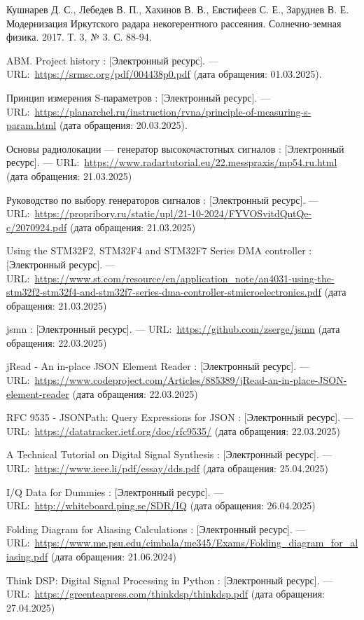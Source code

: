 \documentclass{report}
\begin{document}
\begin{thebibliography}{}

 Кушнарев Д. С., Лебедев В. П., Хахинов В. В., Евстифеев С. Е., Заруднев В. Е. Модернизация Иркутского радара некогерентного рассеяния. Солнечно-земная физика. 2017. Т. 3, № 3. С. 88-94.

 ABM. Project history : [Электронный ресурс]. --– URL:~\url{https://srmsc.org/pdf/004438p0.pdf} (дата обращения: 01.03.2025).

 Принцип измерения S-параметров : [Электронный ресурс]. --– URL:~\url{https://planarchel.ru/instruction/rvna/principle-of-measuring-s-param.html} (дата обращения: 20.03.2025).

 Основы радиолокации --- генератор высокочастотных сигналов : [Электронный ресурс]. --– URL:~\url{https://www.radartutorial.eu/22.messpraxis/mp54.ru.html} (дата обращения: 21.03.2025)

 Руководство по выбору генераторов сигналов : [Электронный ресурс]. --– URL:~\url{https://propribory.ru/static/upl/21-10-2024/FYVOSvitdQntQe-c/2070924.pdf} (дата обращения: 21.03.2025)

 Using the STM32F2, STM32F4 and STM32F7 Series DMA controller : [Электронный ресурс]. --– URL:~\url{https://www.st.com/resource/en/application_note/an4031-using-the-stm32f2-stm32f4-and-stm32f7-series-dma-controller-stmicroelectronics.pdf} (дата обращения: 21.03.2025)

 jsmn : [Электронный ресурс]. --– URL:~\url{https://github.com/zserge/jsmn} (дата обращения: 22.03.2025)

 jRead - An in-place JSON Element Reader : [Электронный ресурс]. --– URL:~\url{https://www.codeproject.com/Articles/885389/jRead-an-in-place-JSON-element-reader} (дата обращения: 22.03.2025)

 RFC 9535 - JSONPath: Query Expressions for JSON : [Электронный ресурс]. --– URL:~\url{https://datatracker.ietf.org/doc/rfc9535/} (дата обращения: 22.03.2025)

 A Technical Tutorial on Digital Signal Synthesis : [Электронный ресурс]. --– URL:~\url{https://www.ieee.li/pdf/essay/dds.pdf} (дата обращения: 25.04.2025)

 I/Q Data for Dummies : [Электронный ресурс]. --– URL:~\url{http://whiteboard.ping.se/SDR/IQ} (дата обращения: 26.04.2025)

 Folding Diagram for Aliasing Calculations : [Электронный ресурс]. --– URL:~\url{https://www.me.psu.edu/cimbala/me345/Exams/Folding_diagram_for_aliasing.pdf} (дата обращения: 21.06.2024)

 Think DSP: Digital Signal Processing in Python : [Электронный ресурс]. --– URL:~\url{https://greenteapress.com/thinkdsp/thinkdsp.pdf} (дата обращения: 27.04.2025)

\end{thebibliography}
\end{document}
